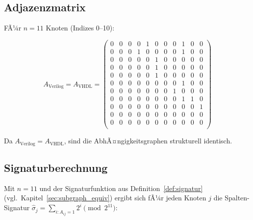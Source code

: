 ﻿\documentclass[12pt,a4paper]{report}
\begin{document}
\subsection{Adjazenzmatrix}

FÃ¼r $n = 11$ Knoten (Indizes 0--10):

\[
A_\mathrm{Verilog} = A_\mathrm{VHDL} =
\begin{pmatrix}
	0& 0& 0& 0& 1& 0& 0& 0& 1& 0& 0 \\ %
	0& 0& 0& 1& 0& 0& 0& 0& 1& 0& 0 \\ %
	0& 0& 0& 0& 0& 1& 0& 0& 0& 0& 0 \\ %
	0& 0& 0& 0& 0& 1& 0& 0& 0& 0& 0 \\ %
	0& 0& 0& 0& 0& 1& 0& 0& 0& 0& 0 \\ %
	0& 0& 0& 0& 0& 0& 0& 0& 1& 0& 0 \\ %
	0& 0& 0& 0& 0& 0& 0& 1& 0& 0& 0 \\ %
	0& 0& 0& 0& 0& 0& 0& 0& 1& 1& 0 \\ %
	0& 0& 0& 0& 0& 0& 0& 0& 0& 0& 1 \\ %
	0& 0& 0& 0& 0& 0& 0& 0& 0& 0& 0 \\ %
	0& 0& 0& 0& 0& 0& 0& 0& 0& 0& 0 \\ %
\end{pmatrix}
\]

Da $A_\mathrm{Verilog} = A_\mathrm{VHDL}$, sind die AbhÃ¤ngigkeitsgraphen
strukturell identisch.

\subsection{Signaturberechnung}

Mit $n = 11$ und der Signaturfunktion aus Definition~\ref{def:signatur}
(vgl.\ Kapitel~\ref{sec:subgraph_equiv}) ergibt sich fÃ¼r jeden Knoten $j$ die
Spalten-Signatur $\hat{\sigma}_j = \sum_{i : A_{ij}=1} 2^i \pmod{2^{11}}$:
\end{document}
